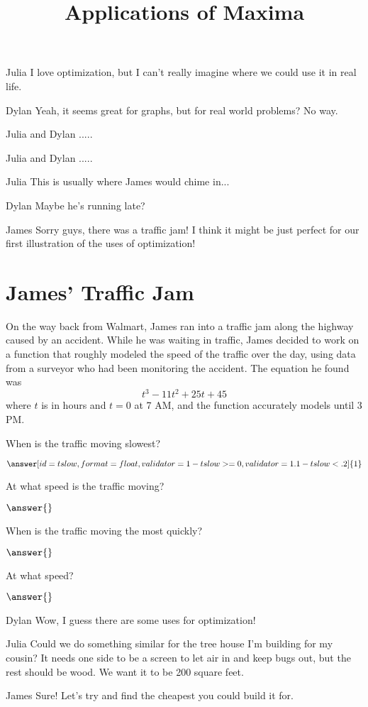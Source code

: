 \documentclass{ximera}
\title{Applications of Maxima}
\begin{document}
\maketitle
\begin{dialogue}
\item[Julia] I love optimization, but I can't really imagine where we could use it in real life.
\item[Dylan] Yeah, it seems great for graphs, but for real world problems? No way.
\item[Julia and Dylan] .....
\item[Julia and Dylan] .....
\item[Julia] This is usually where James would chime in...
\item[Dylan] Maybe he's running late?
\item[James] Sorry guys, there was a traffic jam! I think it might be just perfect for our first illustration of the uses of optimization!
\end{dialogue}

\section{James' Traffic Jam}
On the way back from Walmart, James ran into a traffic jam along the highway caused by an accident. While he was waiting in traffic, James decided to work on a function that roughly modeled the speed of the traffic over the day, using data from a surveyor who had been monitoring the accident. The equation he found was $$t^3-11t^2+25t+45$$ where $t$ is in hours and $t = 0$ at 7 AM, and the function accurately models until 3 PM.
\begin{question}

When is the traffic moving slowest?

$\answer[id=tslow, format=float, validator=1-tslow>=0, validator=1.1-tslow<.2]{1}$ \begin{multipleChoice}
\end{multipleChoice}

At what speed is the traffic moving?

$\answer{}$
\end{question}
\begin{question}

When is the traffic moving the most quickly?

$\answer{}$

At what speed?

$\answer{}$

\end{question}
\begin{dialogue}
\item[Dylan] Wow, I guess there are some uses for optimization!
\item[Julia] Could we do something similar for the tree house I'm building for my cousin? It needs one side to be a screen to let air in and keep bugs out, but the rest should be wood. We want it to be 200 square feet.
\item[James] Sure! Let's try and find the cheapest you could build it for.
\end{dialogue}
\end{document}
